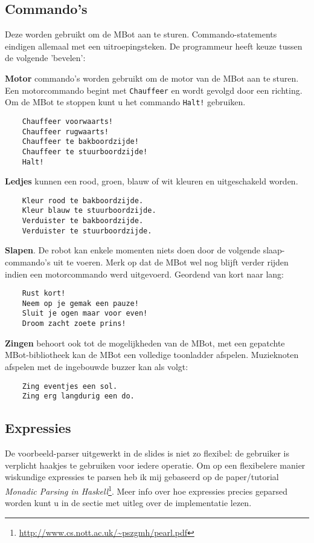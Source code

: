 \documentclass[11pt]{article}
\begin{document}
\subsection{Commando's}
Deze worden gebruikt om de MBot aan te sturen. Commando-statements eindigen allemaal met een uitroepingsteken. De programmeur heeft keuze tussen de volgende 'bevelen':
\begin{description}
    \item{\bf Motor} commando's worden gebruikt om de motor van de MBot aan te sturen. Een motorcommando begint met \texttt{Chauffeer} en wordt gevolgd door een richting. Om de MBot te stoppen kunt u het commando \texttt{Halt!} gebruiken.
   \begin{lstlisting}
    Chauffeer voorwaarts!
    Chauffeer rugwaarts!
    Chauffeer te bakboordzijde!
    Chauffeer te stuurboordzijde!
    Halt!\end{lstlisting}
\item{\bf Ledjes} kunnen een rood, groen, blauw of wit kleuren en uitgeschakeld worden.
    \begin{lstlisting}
    Kleur rood te bakboordzijde.
    Kleur blauw te stuurboordzijde.
    Verduister te bakboordzijde.
    Verduister te stuurboordzijde.\end{lstlisting}
\item{\bf Slapen}. De robot kan enkele momenten niets doen door de volgende slaap-commando's uit te voeren. Merk op dat de MBot wel nog blijft verder rijden indien een motorcommando werd uitgevoerd. Geordend van kort naar lang:
    \begin{lstlisting}
    Rust kort!
    Neem op je gemak een pauze!
    Sluit je ogen maar voor even!
    Droom zacht zoete prins!\end{lstlisting}
\item{\bf Zingen} behoort ook tot de mogelijkheden van de MBot, met een gepatchte MBot-bibliotheek kan de MBot een volledige toonladder afspelen. Muzieknoten afspelen met de ingebouwde buzzer kan als volgt:
    \begin{lstlisting}
    Zing eventjes een sol.
    Zing erg langdurig een do.\end{lstlisting}
\end{description}
\subsection{Expressies}
De voorbeeld-parser uitgewerkt in de slides is niet zo flexibel: de gebruiker is verplicht haakjes te gebruiken voor iedere operatie. Om op een flexibelere manier wiskundige expressies te parsen heb ik mij gebaseerd op de paper/tutorial \textit{Monadic Parsing in Haskell}\footnote{\url{http://www.cs.nott.ac.uk/~pszgmh/pearl.pdf}}. Meer info over hoe expressies precies geparsed worden kunt u in de sectie met uitleg over de implementatie lezen.
\end{document}
